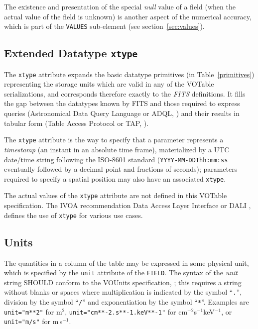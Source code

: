 \documentclass[11pt,a4paper]{ivoa}
\def\Aref#1{section~\ref{#1}}
\def\Tref#1{Table~\ref{#1}}
\let\fg=\color
\def\attr#1{{\tt{\fg{DarkRed}#1}}}
\def\elem#1{{\tt{\fg{DarkRed}#1}}}
\def\attrval#1#2{{\tt{\fg{DarkRed}#1}="{\fg{DarkPurple}#2}"}}
\begin{document}
The existence and presentation of the special {\em null} value of
a field (when the actual value of the field is unknown) is
another aspect of the numerical accuracy, which is part of the
\elem{VALUES} sub-element (see \Aref{sec:values}).

\subsection{Extended Datatype \attr{xtype}}
\label{sec:xtype}

The \attr{xtype} attribute expands the basic
datatype primitives (in \Tref{primitives})
representing the storage units which are valid in any of the
VOTable serializations,
and corresponds therefore exactly to the {\em FITS} definitions.
It fills the gap between the datatypes
known by FITS and those required to express queries
(Astronomical Data Query Language or ADQL, \citet{2008ivoa.spec.1030O})
and their results in tabular form (Table Access Protocol or TAP,
\citet{2010ivoa.spec.0327D}).

The \attr{xtype} attribute is the way to
specify that a parameter represents a {\em  timestamp}
(an instant in an absolute time frame), materialized by a
UTC date/time string following the ISO-8601 standard
({\tt YYYY-MM-DDThh:mm:ss} eventually followed by a decimal point
and fractions of seconds);
parameters required to specify a spatial position may also have an associated
\attr{xtype}.

The actual values of the \attr{xtype} attribute are not defined
in this VOTable specification.
The IVOA recommendation Data Access Layer Interface
or DALI \citep{2017ivoa.spec.0517D},
defines the use of \attr{xtype} for various use cases.

\subsection{Units}
\label{sec:unit}

The quantities in a column of the table may be expressed in
some physical unit,
which is specified by the {\attr{unit}}
attribute of the {\elem{FIELD}}.
The syntax of the {\em unit} string SHOULD conform to
the VOUnits specification, \citet{2023ivoa.spec.1215G};
this requires a string without blanks or spaces
where multiplication is indicated by the symbol ``{\tt.}'',
division by the symbol ``{\tt/}''
and exponentiation by the symbol ``{\tt**}''.
Examples are \attrval{unit}{m**2} for m$^2$,
\attrval{unit}{cm**-2.s**-1.keV**-1} for cm$^{-2}$s$^{-1}$keV$^{-1}$,
or \attrval{unit}{m/s} for m\,s$^{-1}$.
\end{document}
